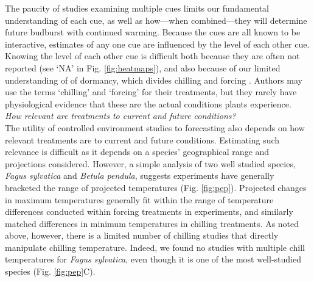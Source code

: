 \documentclass[11pt,letter]{article}
\begin{document}
The paucity of studies examining multiple cues limits our fundamental understanding of each cue, as well as how---when combined---they will determine future budburst with continued warming. Because the cues are all known to be interactive, estimates of any one cue are influenced by the level of each other cue. Knowing the level of each other cue is difficult both because they are often not reported (see `NA' in Fig. \ref{fig:heatmaps}), and also because of our limited understanding of  of dormancy, which divides chilling and forcing \citep[][]{chuine2016}. Authors may use the terms `chilling' and `forcing' for their treatments, but they rarely have physiological evidence that these are the actual conditions plants experience. \\

\emph{How relevant are treatments to current and future conditions?}\\
The utility of controlled environment studies to forecasting also depends on how relevant treatments are to current and future conditions. Estimating such relevance is difficult as it depends on a species' geographical range and projections considered. However, a simple analysis of two well studied species, \emph{Fagus sylvatica} and \emph{Betula pendula}, suggests experiments have generally bracketed the range of projected temperatures (Fig. \ref{fig:pep}). Projected changes in maximum temperatures generally fit within the range of temperature differences conducted within forcing treatments in experiments, and similarly matched differences in minimum temperatures in chilling treatments. As noted above, however, there is a limited number of chilling studies that directly manipulate chilling temperature. Indeed, we found no studies with multiple chill temperatures for \emph{Fagus sylvatica}, even though it is one of the most well-studied species (Fig. \ref{fig:pep}C). \\
\end{document}
